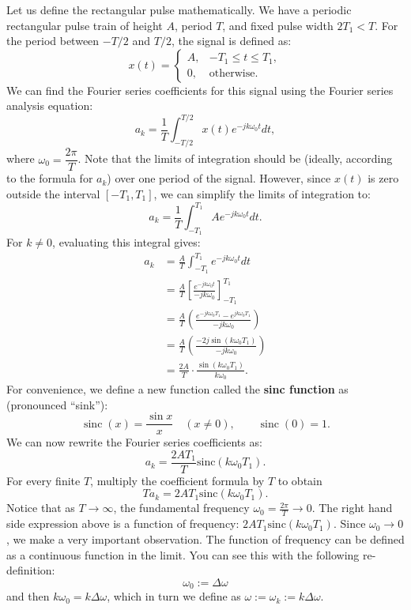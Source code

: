 Let us define the rectangular pulse mathematically. We have a periodic rectangular pulse train of height $A$, period $T$, and fixed pulse width $2T_1<T$. For the period between $-T/2$ and $T/2$, the signal is defined as:
\[
x(t) = \begin{cases}
A, & -T_1 \le t \le T_1,\\
0, & \text{otherwise.}
\end{cases}
\]
We can find the Fourier series coefficients for this signal using the Fourier series analysis equation:
\[
a_k = \frac{1}{T} \int_{-T/2}^{T/2} x(t) e^{-jk\omega_0 t} dt,
\]
where $\omega_0 = \dfrac{2\pi}{T}$. Note that the limits of integration should be (ideally, according to the formula for $a_k$) over one period of the signal. However, since $x(t)$ is zero outside the interval $[-T_1, T_1]$, we can simplify the limits of integration to:
\[
a_k = \frac{1}{T} \int_{-T_1}^{T_1} A e^{-jk\omega_0 t} dt.
\]
For $k\ne0$, evaluating this integral gives:
\begin{align*}
    a_k &= \frac{A}{T} \int_{-T_1}^{T_1} e^{-jk\omega_0 t} dt \\
    &= \frac{A}{T} \left[ \frac{e^{-jk\omega_0 t}}{-jk\omega_0} \right]_{-T_1}^{T_1} \\
    &= \frac{A}{T} \left( \frac{e^{-jk\omega_0 T_1} - e^{jk\omega_0 T_1}}{-jk\omega_0} \right) \\
    &= \frac{A}{T} \left( \frac{-2j \sin(k\omega_0 T_1)}{-jk\omega_0} \right) \\
    &= \frac{2A}{T} \cdot \frac{\sin(k\omega_0 T_1)}{k\omega_0}.
\end{align*}
For convenience, we define a new function called the \textbf{sinc function} as (pronounced ``sink''):
\[
\operatorname{sinc}(x)=\frac{\sin x}{x}\quad(x\ne0),\qquad \operatorname{sinc}(0)=1.
\]
We can now rewrite the Fourier series coefficients as:
\[
a_k = \frac{2A T_1}{T} \textrm{sinc}(k\omega_0 T_1).
\]
For every finite $T$, multiply the coefficient formula by $T$ to obtain 
\[
T a_k = 2AT_1 \textrm{sinc}(k\omega_0 T_1).
\]
Notice that as $T \to \infty$, the fundamental frequency $\omega_0 = \frac{2\pi}{T} \to 0$. The right hand side expression above is a function of frequency: $2A T_1 \textrm{sinc}(k\omega_0 T_1)$. Since $\omega_0 \to 0$, we make a very important observation. The function of frequency can be defined as a continuous function in the limit. You can see this with the following re-definition:
\[
\omega_0 := \Delta \omega 
\] 
and then $k \omega_0 = k \Delta \omega$, which in turn we define as $\omega := \omega_k := k \Delta \omega$.

